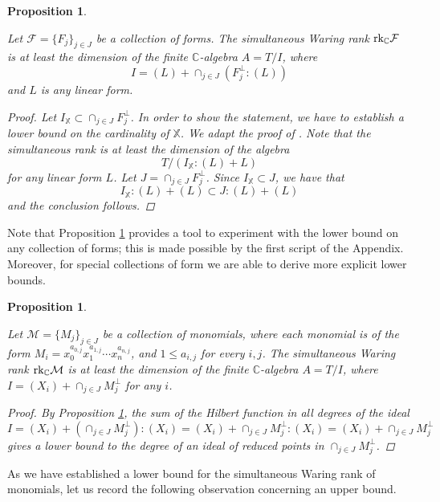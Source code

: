\documentclass{amsart}
\theoremstyle{plain}
\newtheorem{proposition}[theorem]{Proposition}
\theoremstyle{definition}
\theoremstyle{remark}
\begin{document}
\begin{proposition}\label{algorithmic lower bound general}

Let $\mathcal F= \lbrace F_j\rbrace_{j\in J}$ be a collection of forms. The simultaneous Waring rank $\textnormal{rk}_{\mathbb C} \mathcal F$ is at least the dimension of the finite $\mathbb C$-algebra $A=T/I$, where \[I=(L)+\cap_{j\in J} ({F}_j^{\perp}:(L))\] and $L$ is any linear form.

\begin{proof}
Let $I_{\mathbb X}\subset\cap_{j\in J} F_j^\perp$. In order to show the statement, we have to establish a lower bound on the cardinality of $\mathbb{X}$. We adapt the proof of \cite[Theorem 3.3]{CCCGW}. Note that the simultaneous rank is at least the dimension of the algebra
\[T/(I_{\mathbb X}:(L)+L)\]
for any linear form $L$.
Let $J=\cap_{j\in J} F_j^\perp$. Since $I_{\mathbb X}\subset J$, we have that
\[I_{\mathbb X}:(L)+(L)\subset J:(L)+(L)\]
and the conclusion follows.
\end{proof}
\end{proposition}

Note that Proposition \ref{algorithmic lower bound general} provides a tool to experiment with the lower bound on any collection of forms; this is made possible by the first script of the Appendix. Moreover, for special collections of form we are able to derive more explicit lower bounds.

\begin{proposition}\label{lower bound general}

Let $\mathcal M= \lbrace M_j\rbrace_{j\in J}$ be a collection of monomials, where each monomial is of the form $M_i=x_0^{a_{0,j}}x_1^{a_{1,j}}\cdots x_n^{a_{n,j}}$, and $1\leq a_{i,j}$ for every $i,j$. The simultaneous Waring rank $\textnormal{rk}_{\mathbb C} \mathcal M$ is at least the dimension of the finite $\mathbb C$-algebra $A=T/I$, where $I=(X_i)+\cap_{j\in J} M_j^{\perp}$ for any $i$.

\begin{proof}
By Proposition \ref{algorithmic lower bound general}, the sum of the Hilbert function in all degrees of the ideal
\[I=(X_i)+(\cap_{j\in J} M_j^{\perp}): (X_i)=(X_i)+\cap_{j\in J} M_j^{\perp}: (X_i) = (X_i)+\cap_{j\in J} M_j^{\perp}\] gives a lower bound to the degree of an ideal of reduced points in $\cap_{j\in J} M_j^{\perp}$.
\end{proof}
\end{proposition}

As we have established a lower bound for the simultaneous Waring rank of monomials, let us record the following observation concerning an upper bound.
\end{document}
